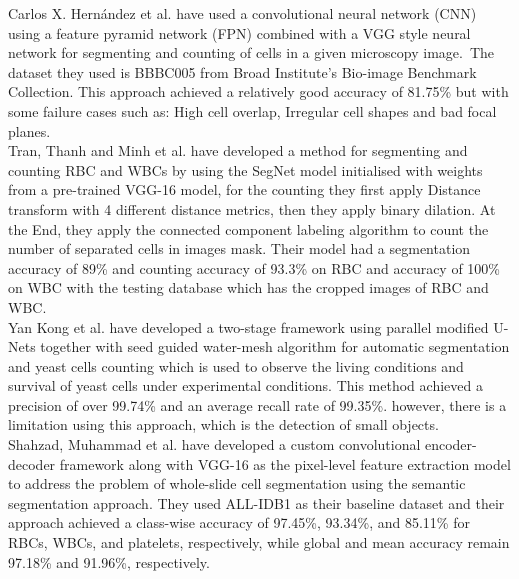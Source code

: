 \documentclass[conference]{IEEEtran}
\begin{document}
Carlos X. Hern{\'{a}}ndez et al. \cite{DBLP:journals/corr/abs-1802-10548} have used a convolutional neural network (CNN) using a feature pyramid network (FPN) combined with a VGG style neural network for segmenting and counting of cells in a given microscopy image.\
The dataset they used is BBBC005 \cite{ljosa2012annotated} from Broad Institute's Bio-image Benchmark Collection. This approach achieved a relatively good accuracy of 81.75\% but with some failure cases such as: High cell overlap, Irregular cell shapes and bad focal planes.\\

Tran, Thanh and Minh et al. \cite{tran2019blood} have developed a method for segmenting and counting RBC and WBCs by using the SegNet model initialised with weights from a pre-trained VGG-16 model, for the counting they first apply Distance transform with 4 different distance metrics, then they apply binary dilation. At the End, they apply the connected component labeling algorithm to count the number of separated cells in images mask. Their model had a segmentation accuracy of 89\% and counting accuracy of 93.3\% on RBC and accuracy of 100\% on WBC with the testing database which has the cropped images of RBC and WBC.\\

Yan Kong et al.\cite{Kong:20} have developed a two-stage framework using parallel modified U-Nets together with seed guided water-mesh algorithm for automatic segmentation and yeast cells counting which is used to observe the living conditions and survival of yeast cells under experimental conditions. This method achieved a precision of over 99.74\% and an average recall rate of 99.35\%. however, there is a limitation using this approach, which is the detection of small objects.\\

Shahzad, Muhammad et al. \cite{shahzad2020robust} have developed a custom convolutional encoder-decoder framework along with VGG-16 as the pixel-level feature extraction model to address the problem of whole-slide cell segmentation using the semantic segmentation approach. They used ALL-IDB1 as their baseline dataset and their approach achieved a class-wise accuracy of 97.45\%, 93.34\%, and 85.11\% for RBCs, WBCs, and platelets, respectively, while global and mean accuracy remain 97.18\% and 91.96\%, respectively.\\
\end{document}
